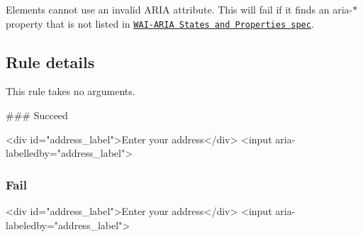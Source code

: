 Elements cannot use an invalid A\+R\+IA attribute. This will fail if it finds an {\ttfamily aria-\/$\ast$} property that is not listed in \href{https://www.w3.org/TR/wai-aria/states_and_properties#state_prop_def}{\tt W\+A\+I-\/\+A\+R\+IA States and Properties spec}.

\subsection*{Rule details}

This rule takes no arguments.

\#\#\# Succeed 
\begin{DoxyCode}
<div id="address\_label">Enter your address</div>
<input aria-labelledby="address\_label">
\end{DoxyCode}


\subsubsection*{Fail}


\begin{DoxyCode}
<div id="address\_label">Enter your address</div>
<input aria-labeledby="address\_label">
\end{DoxyCode}
 
